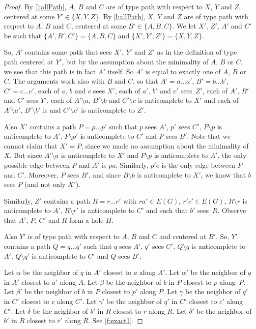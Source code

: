 \documentclass[11pt]{article}
\newcommand{\sm}{\setminus}
\theoremstyle{definition}
\theoremstyle{definition}
\begin{document}
\begin{proof}
  By \cref{l:allPath}, $A$, $B$ and $C$ are of type path with
  respect to $X$, $Y$ and $Z$, centered at some $Y'\in \{X, Y, Z\}$.  
  By \cref{l:allPath}, $X$, $Y$ and $Z$ are of type path with
  respect to $A$, $B$ and $C$, centered at some $B' \in \{A, B,
  C\}$. We let $X'$, $Z'$, $A'$ and $C'$ be such that $\{A', B', C'\}
  = \{A, B, C\}$ and $\{X', Y', Z'\} = \{X, Y, Z\}$.    

  So, $A'$ contains some path that sees $X'$, $Y'$ and $Z'$ as in the
  definition of type path centered at $Y'$, but by the assumption
  about the minimality of $A$, $B$ or $C$, we see that this path is in
  fact $A'$ itself. So $A'$ is equal to exactly one of $A$, $B$ or
  $C$. The arguments work also with $B$ and $C$, so that
  $A'=a\dots a'$, $B'= b\dots b'$, $C'= c \dots c'$, each of $a$, $b$
  and $c$ sees $X'$, each of $a'$, $b'$ and $c'$ sees~$Z'$, each of
  $A'$, $B'$ and $C'$ sees $Y'$, each of $A'\sm a$, $B'\sm b$ and
  $C'\sm c$ is anticomplete to $X'$ and each of $A'\sm a'$, $B'\sm b'$
  is and $C'\sm c'$ is anticomplete to $Z'$.

  Also $X'$ contains a path $P = p\dots p'$ such that $p$ sees $A'$,
  $p'$ sees $C'$, $P\sm p$ is anticomplete to $A'$, $P\sm p'$ is
  anticomplete to $C'$ and $P$ sees $B'$. Note that we cannot claim
  that $X'=P$, since we made no assumption about the minimality of
  $X$.  But since $A'\sm a$ is anticomplete to $X'$ and $P\sm p$ is
  anticomplete to $A'$, the only possible edge between $P$ and $A'$ is
  $pa$.  Similarly, $p'c$ is the only edge between $P$ and $C'$.
  Moreover, $P$ sees $B'$, and since $B\sm b$ is anticomplete to $X'$,
  we know that $b$ sees $P$ (and not only $X'$).

  Similarly, $Z'$ contains a path $R = r\dots r'$ with $ra'\in E(G)$,
  $r'c'\in E(G)$, $R\sm r$ is anticomplete to $A'$, $R\sm r'$ is
  anticomplete to $C'$ and such that $b'$ sees~$R$.  Observe that
  $A'$, $P$, $C'$ and $R$ form a hole $H$.

  Also $Y'$ is of type path with respect to $A$, $B$ and $C$ and
  centered at $B'$. So, $Y'$ contains a path $Q = q\dots q'$ such that
  $q$ sees $A'$, $q'$ sees $C'$, $Q\sm q$ is anticomplete to $A'$,
  $Q\sm q'$ is anticomplete to $C'$ and $Q$ sees $B'$.

  Let $\alpha$ be the neighbor of $q$ in $A'$ closest to $a$ along
  $A'$.  Let $\alpha'$ be the neighbor of $q$ in $A'$ closest to $a'$
  along $A$.  Let $\beta$ be the neighbor of $b$ in $P$ closest to $p$
  along~$P$.  Let $\beta'$ be the neighbor of $b$ in $P$ closest to
  $p'$ along $P$.  Let $\gamma$ be the neighbor of $q'$ in $C'$
  closest to $c$ along $C'$.  Let $\gamma'$ be the neighbor of $q'$ in
  $C'$ closest to $c'$ along $C'$.  Let $\delta$ be the neighbor of
  $b'$ in $R$ closest to $r$ along $R$.  Let $\delta'$ be the neighbor
  of $b'$ in $R$ closest to $r'$ along $R$.  See \cref{f:exact1}.


\end{proof}
\end{document}

